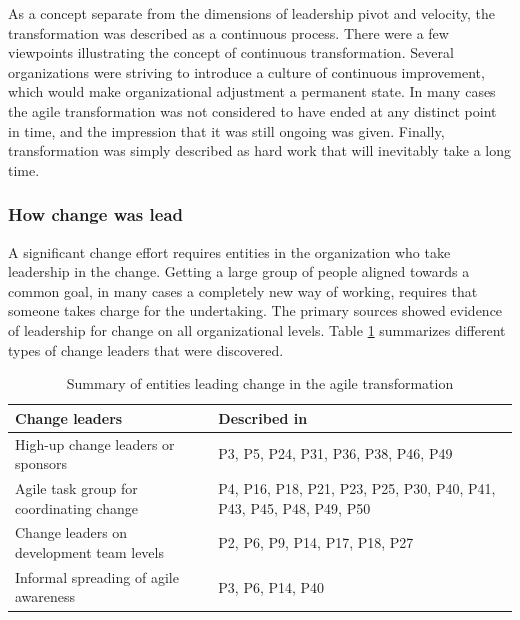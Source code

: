 \documentclass[preprint,authoryear,12pt]{elsarticle}
\begin{document}
As a concept separate from the dimensions of leadership pivot and velocity, the
transformation was described as a continuous process. There were a few
viewpoints illustrating the concept of continuous transformation. Several
organizations were striving to introduce a culture of continuous improvement,
which would make organizational adjustment a permanent state. In many cases the
agile transformation was not considered to have ended at any distinct point in
time, and the impression that it was still ongoing was given. Finally,
transformation was simply described as hard work that will inevitably take a
long time.















\subsubsection{How change was lead}

A significant change effort requires entities in the organization who take
leadership in the change. Getting a large group of people aligned towards a
common goal, in many cases a completely new way of working, requires that
someone takes charge for the undertaking. The primary sources showed evidence of
leadership for change on all organizational levels. Table
\ref{table:transformation_leadership} summarizes different types of change
leaders that were discovered.

\begin{table}[h]
    \centering
    \begin{tabular}{ >{\raggedright\arraybackslash}p{}
                     >{\raggedright\arraybackslash}p{} }
        \toprule
        Change leaders         &  Described in  \\
        \midrule
        High-up change leaders or sponsors  &
                P3, P5, P24, P31, P36, P38, P46, P49  \\
        Agile task group for coordinating change   &
                P4, P16, P18, P21, P23, P25, P30, P40, P41,
                P43, P45, P48, P49, P50  \\
        Change leaders on development team levels  &
                P2, P6, P9, P14, P17, P18, P27  \\
        Informal spreading of agile awareness  &
                P3, P6, P14, P40  \\
        \bottomrule
    \end{tabular}
    \caption{Summary of entities leading change in the agile transformation}
    \label{table:transformation_leadership}
\end{table}
\end{document}

